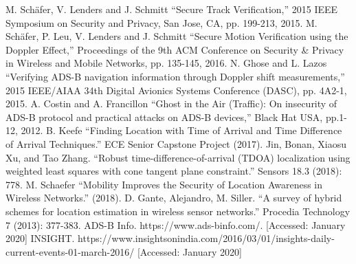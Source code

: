 \documentclass[conference]{IEEEtran}
\begin{document}
\begin{thebibliography}{00}
 M. Schäfer, V. Lenders and J. Schmitt ``Secure Track Verification,'' 2015 IEEE Symposium on Security and Privacy, San Jose, CA, pp. 199-213, 2015.
 M. Schäfer, P. Leu, V. Lenders and J. Schmitt ``Secure Motion Verification using the Doppler Effect,'' Proceedings of the 9th ACM Conference on Security \& Privacy in Wireless and Mobile Networks, pp. 135-145, 2016.
 N. Ghose and L. Lazos ``Verifying ADS-B navigation information through Doppler shift measurements,'' 2015 IEEE/AIAA 34th Digital Avionics Systems Conference (DASC), pp. 4A2-1, 2015.
 A. Costin and A. Francillon ``Ghost in the Air (Traffic): On insecurity of ADS-B protocol and practical attacks on ADS-B devices,'' Black Hat USA, pp.1-12, 2012.
B. Keefe ``Finding Location with Time of Arrival and Time Difference of Arrival Techniques.'' ECE Senior Capstone Project (2017).
Jin, Bonan, Xiaosu Xu, and Tao Zhang. ``Robust time-difference-of-arrival (TDOA) localization using weighted least squares with cone tangent plane constraint.'' Sensors 18.3 (2018): 778.
M. Schaefer ``Mobility Improves the Security of Location Awareness in Wireless Networks.'' (2018).
D. Gante, Alejandro, M. Siller. ``A survey of hybrid schemes for location estimation in wireless sensor networks.'' Procedia Technology 7 (2013): 377-383.
ADS-B Info. https://www.ads-binfo.com/. [Accessed: January 2020]
INSIGHT. https://www.insightsonindia.com/2016/03/01/insights-daily-current-events-01-march-2016/ [Accessed: January 2020]
\end{thebibliography}
\end{document}

